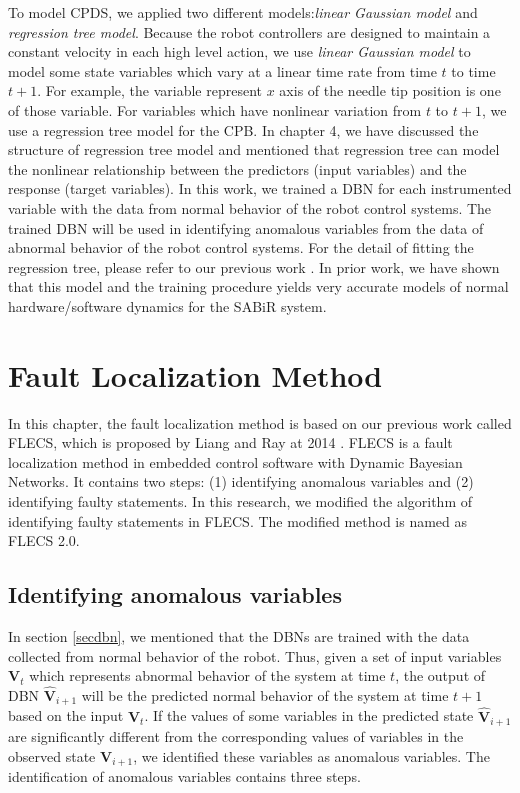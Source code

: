 To model CPDS, we applied two different models:{\it linear Gaussian model} and {\it regression tree model}. Because the robot controllers are designed to maintain a constant velocity in each high level action, we use {\it linear Gaussian model} to model some state variables which vary at a linear time rate from time $t$ to time $t+1$. For example, the variable represent $x$ axis of the needle tip position is one of those variable. For variables which have nonlinear variation from $t$ to $t+1$, we use a regression tree model for the CPB. In chapter 4, we have discussed the structure of regression tree model and mentioned that regression tree can model the nonlinear relationship between the predictors (input variables) and the response (target variables). In this work, we trained a DBN for each instrumented variable with the data from normal behavior of the robot control systems. The trained DBN will be used in identifying anomalous variables from the data of abnormal behavior of the robot control systems. For the detail of fitting the regression tree, please refer to our previous work \cite{cao2012classification}. In prior work, we have shown that this model and the training procedure yields very accurate models of normal hardware/software dynamics for the SABiR system. 

\section{Fault Localization Method}\label{dbnflalg}
In this chapter, the fault localization method is based on our previous work called FLECS, which is proposed by Liang and Ray at 2014 \cite{liang2015fault}. FLECS is a fault localization method in embedded control software with Dynamic Bayesian Networks. It contains two steps: (1) identifying anomalous variables and (2) identifying faulty statements. In this research, we modified the algorithm of identifying faulty statements in FLECS. The modified method is named as FLECS 2.0. 

\subsection{Identifying anomalous variables}
In section \ref{secdbn}, we mentioned that the DBNs are trained with the data collected from normal behavior of the robot. Thus, given a set of input variables ${\pmb{V}_t}$ which represents abnormal behavior of the system at time $t$, the output of DBN $ {\pmb{{\hat V}}_{i + 1}} $ will be the predicted normal behavior of the system at time $t+1$ based on the input ${\pmb{V}_t} $. If the values of some variables in the predicted state $ {\pmb{{\hat V}}_{i + 1}} $ are significantly different from the corresponding values of variables in the observed state  $ {\pmb{V}_{i + 1}} $, we identified these variables as anomalous variables. The identification of anomalous variables contains three steps.

